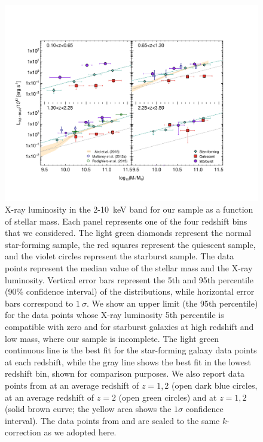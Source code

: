    \begin{figure}
   \centering
   \includegraphics[trim={1cm 2cm 2.5cm 3cm}, clip,width=\textwidth]{Figs/L_X.pdf}
      \caption{X-ray luminosity in the 2-10~keV band for our sample as a function of stellar mass. Each panel represents one of the four redshift bins that we considered. The light green diamonds represent the normal star-forming sample, the red squares represent the quiescent sample, and the violet circles represent the starburst sample. The data points represent the median value of the stellar mass and the X-ray luminosity. Vertical error bars represent the 5th and 95th percentile (90\% confidence interval) of the distributions, while horizontal error bars correspond to $1~\sigma$. We show an upper limit (the 95th percentile) for the data points whose X-ray luminosity 5th percentile is compatible with zero and for starburst galaxies at high redshift and low mass, where our sample is incomplete.
      The light green continuous line is the best fit for the star-forming galaxy data points at each redshift, while the gray line shows the best fit in the lowest redshift bin, shown for comparison purposes.  
      We also report data points from \citet{2012ApJ...753L..30M} at an average redshift of $z=1,2$ (open dark blue circles, \citet{2015ApJ...800L..10R} at an average redshift of $z=2$ (open green circles) and \citet{2018MNRAS.474.1225A} at $z=1,2$ (solid brown curve; the yellow area shows the $1\sigma$ confidence interval). The data points from \citet{2015ApJ...800L..10R} and \citet{2018MNRAS.474.1225A} are scaled to the same $k$-correction as we adopted here.
              }
         \label{fig:L_X}
   \end{figure}
